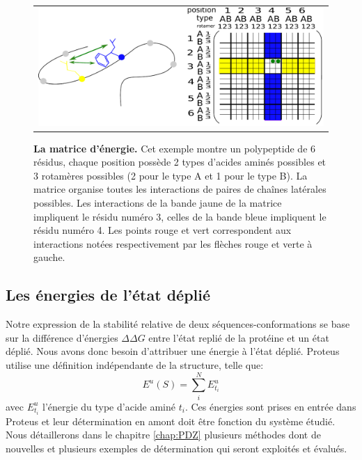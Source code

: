    \begin{figure}[!htbp]
     \centering
     \begin{tabular}{c} 
       \includegraphics[width=15cm]{figure/matrice.pdf}
       \label{Graph:mat_ener}
     \end{tabular}
     
     \caption{\textbf{La matrice d'énergie.} Cet exemple montre un polypeptide de 6 résidus, chaque position possède 2 types d'acides aminés possibles et 3 rotamères possibles (2 pour le type A et 1 pour le type B). La matrice organise toutes les interactions de paires de chaînes latérales possibles. Les interactions de la bande jaune de la matrice impliquent le résidu numéro 3, celles de la bande bleue impliquent le résidu numéro 4. Les points rouge et vert correspondent aux interactions notées respectivement par les flèches rouge et verte à gauche.}
\label{fig:matener}
   \end{figure}
   
\subsection{Les énergies de l'état déplié}
Notre expression de la stabilité relative de deux séquences-conformations se base sur la différence d'énergies $\Delta \Delta G$ entre l'état replié de la protéine et un état déplié. Nous avons donc besoin d'attribuer une énergie à l'état déplié. Proteus utilise une définition indépendante de la structure, telle que:
\begin{equation}
E^u(S) = \sum_i^N E^u_{t_i}  
\end{equation}
avec $E^u_{t_i}$ l'énergie du type d'acide aminé $t_i$. Ces énergies sont prises en entrée dans Proteus et leur détermination en amont doit être fonction du système étudié. Nous détaillerons dans le chapitre \ref{chap:PDZ} plusieurs méthodes dont de nouvelles et plusieurs exemples de détermination qui seront exploités et évalués.

